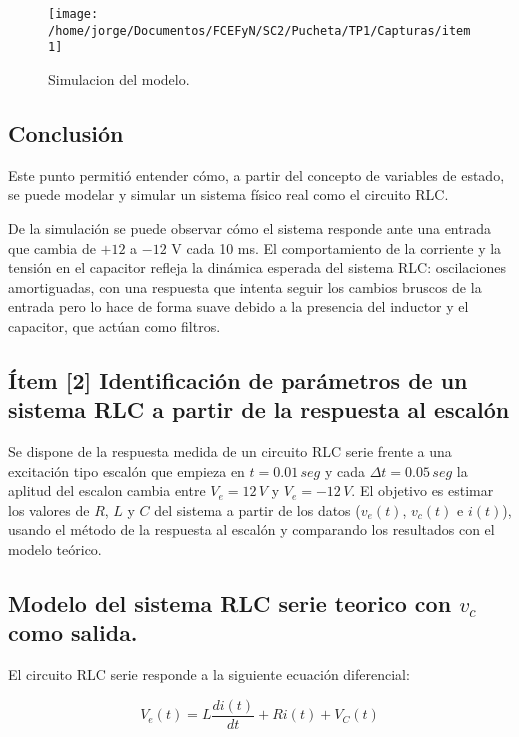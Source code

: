 \documentclass{article}
\begin{document}
\begin{figure}[h!t]
      \centering
        \texttt{[image: /home/jorge/Documentos/FCEFyN/SC2/Pucheta/TP1/Capturas/item1]}
          \caption{Simulacion del modelo.}
            \label{fig:etiqueta}
        \end{figure} 

\subsection*{Conclusión}

Este punto permitió entender cómo, a partir del concepto de variables de estado, se puede modelar y simular un sistema físico real como el circuito RLC. 

De la simulación se puede observar cómo el sistema responde ante una entrada que cambia de $+12$ a $-12$ V cada 10 ms. El comportamiento de la corriente y la tensión en el capacitor refleja la dinámica esperada del sistema RLC: oscilaciones amortiguadas, con una respuesta que intenta seguir los cambios bruscos de la entrada pero lo hace de forma suave debido a la presencia del inductor y el capacitor, que actúan como filtros.



\subsection*{ Ítem [2] Identificación de parámetros de un sistema RLC a partir de la respuesta al escalón}

Se dispone de la respuesta medida de un circuito RLC serie frente a una excitación tipo escalón que empieza en $t=0.01 \, seg$ y cada $\Delta t=0.05 \, seg$ la aplitud del escalon cambia entre $V_e=12 \, V$ y $V_e=-12 \, V $. El objetivo es estimar los valores de $R$, $L$ y $C$ del sistema a partir de los datos ($v_e(t)$, $v_c(t)$ e $i(t)$), usando el método de la respuesta al escalón y comparando los resultados con el modelo teórico.

\subsection*{Modelo del sistema RLC serie teorico con $v_c$ como salida.}
El circuito RLC serie responde a la siguiente ecuación diferencial:

\begin{equation}
V_e(t) = L \frac{di(t)}{dt} + R i(t) + V_C(t)
\end{equation}
\end{document}
